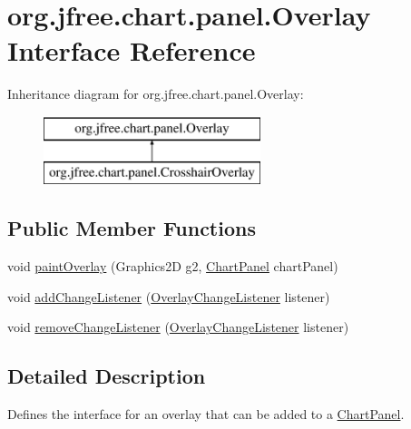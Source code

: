 \hypertarget{interfaceorg_1_1jfree_1_1chart_1_1panel_1_1_overlay}{}\section{org.\+jfree.\+chart.\+panel.\+Overlay Interface Reference}
\label{interfaceorg_1_1jfree_1_1chart_1_1panel_1_1_overlay}
Inheritance diagram for org.\+jfree.\+chart.\+panel.\+Overlay\+:\begin{figure}[H]
\begin{center}
\leavevmode
\includegraphics[height=2.000000cm]{interfaceorg_1_1jfree_1_1chart_1_1panel_1_1_overlay}
\end{center}
\end{figure}
\subsection*{Public Member Functions}
\begin{DoxyCompactItemize}
\item 
void \mbox{\hyperlink{interfaceorg_1_1jfree_1_1chart_1_1panel_1_1_overlay_aef899ccf9040a90153f231db8796069f}{paint\+Overlay}} (Graphics2D g2, \mbox{\hyperlink{classorg_1_1jfree_1_1chart_1_1_chart_panel}{Chart\+Panel}} chart\+Panel)
\item 
void \mbox{\hyperlink{interfaceorg_1_1jfree_1_1chart_1_1panel_1_1_overlay_aa1d3ce6adb108ff2b780dcb40d09e6ee}{add\+Change\+Listener}} (\mbox{\hyperlink{interfaceorg_1_1jfree_1_1chart_1_1event_1_1_overlay_change_listener}{Overlay\+Change\+Listener}} listener)
\item 
void \mbox{\hyperlink{interfaceorg_1_1jfree_1_1chart_1_1panel_1_1_overlay_a9f3320b02450b959d11045136952cca4}{remove\+Change\+Listener}} (\mbox{\hyperlink{interfaceorg_1_1jfree_1_1chart_1_1event_1_1_overlay_change_listener}{Overlay\+Change\+Listener}} listener)
\end{DoxyCompactItemize}


\subsection{Detailed Description}
Defines the interface for an overlay that can be added to a \mbox{\hyperlink{classorg_1_1jfree_1_1chart_1_1_chart_panel}{Chart\+Panel}}.

